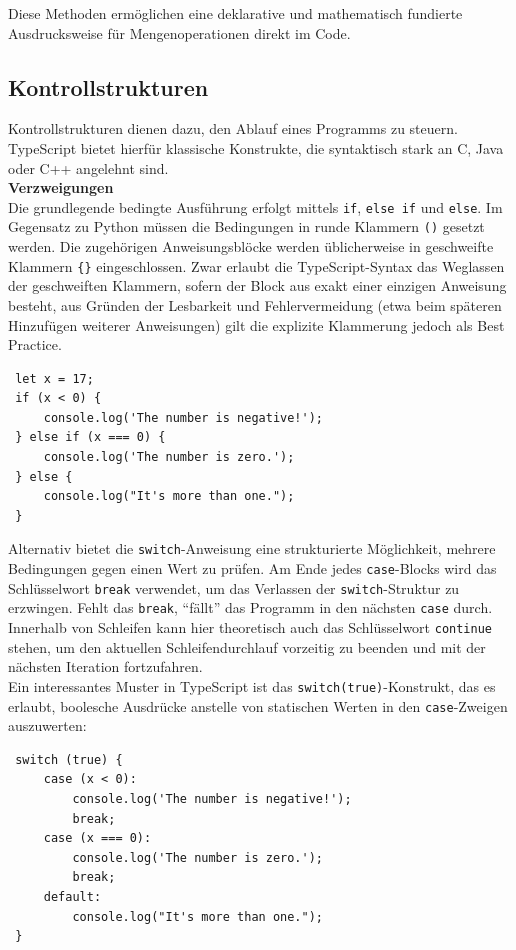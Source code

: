 Diese Methoden ermöglichen eine deklarative und mathematisch fundierte Ausdrucksweise für Mengenoperationen direkt im Code.


\subsection{Kontrollstrukturen}
Kontrollstrukturen dienen dazu, den Ablauf eines Programms zu steuern. TypeScript bietet hierfür klassische Konstrukte, die syntaktisch stark an C, Java oder C++ angelehnt sind. \\

\textbf{Verzweigungen}\\
Die grundlegende bedingte Ausführung erfolgt mittels \texttt{if}, \texttt{else if} und \texttt{else}. Im Gegensatz zu Python müssen die Bedingungen in runde Klammern \texttt{()} gesetzt werden. Die zugehörigen Anweisungsblöcke werden üblicherweise in geschweifte Klammern \texttt{\{\}} eingeschlossen. Zwar erlaubt die TypeScript-Syntax das Weglassen der geschweiften Klammern, sofern der Block aus exakt einer einzigen Anweisung besteht, aus Gründen der Lesbarkeit und Fehlervermeidung (etwa beim späteren Hinzufügen weiterer Anweisungen) gilt die explizite Klammerung jedoch als Best Practice.
\begin{verbatim}
 let x = 17;
 if (x < 0) {
     console.log('The number is negative!');
 } else if (x === 0) {
     console.log('The number is zero.');
 } else {
     console.log("It's more than one.");
 }
\end{verbatim}

Alternativ bietet die \texttt{switch}-Anweisung eine strukturierte Möglichkeit, mehrere Bedingungen gegen einen Wert zu prüfen. Am Ende jedes \texttt{case}-Blocks wird das Schlüsselwort \texttt{break} verwendet, um das Verlassen der \texttt{switch}-Struktur zu erzwingen. Fehlt das \texttt{break}, \enquote{fällt} das Programm in den nächsten \texttt{case} durch. Innerhalb von Schleifen kann hier theoretisch auch das Schlüsselwort \texttt{continue} stehen, um den aktuellen Schleifendurchlauf vorzeitig zu beenden und mit der nächsten Iteration fortzufahren.\\
Ein interessantes Muster in TypeScript ist das \texttt{switch(true)}-Konstrukt, das es erlaubt, boolesche Ausdrücke anstelle von statischen Werten in den \texttt{case}-Zweigen auszuwerten:
\begin{verbatim}
 switch (true) {
     case (x < 0):
         console.log('The number is negative!');
         break;
     case (x === 0):
         console.log('The number is zero.');
         break;
     default:
         console.log("It's more than one.");
 }
\end{verbatim}

